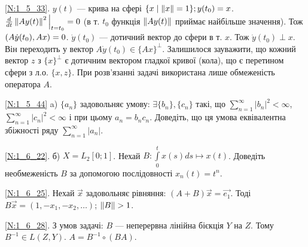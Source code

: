 \noindent\ref{N:1_5_33}.
    $y(t)$ --- крива на сфері $\{x \mid \left\lVert x\right\rVert = 1\}; y(t_0) = x$. $\frac{d}{dt} \left\lVert A y(t)\right\rVert^2 \Big|_{t = t_0} = 0$
    (в т. $t_0$ функція $\left\lVert A y(t)\right\rVert$ приймає найбільше значення). Тож $\left(A \dot{y} (t_0), A x\right) = 0$.
    $\dot{y} (t_0)$ --- дотичний вектор до сфери в т. $x$. Тож $\dot{y} (t_0) \perp x$. 
Він переходить у вектор $A \dot{y} (t_0) \in \{Ax\}^{\perp}$. Залишилося зауважити, що кожний вектор $z$ з $\{x\}^{\perp}$ є дотичним вектором
гладкої кривої (кола), що є перетином сфери з л.о. $\{x, z\}$. При розв'язанні задачі використана лише обмеженість оператора $A$.

\noindent \ref{N:1_5_44} a) $\{a_n\}$ задовольняє умову: $\exists \{b_n\}, 
\{c_n\}$ такі, що $\sum\limits_{n=1}^{\infty}|b_n|^2 < \infty$, 
$\sum\limits_{n=1}^{\infty}|c_n|^2 < \infty$ і при цьому $a_n = b_nc_n$.
Доведіть, що ця умова еквівалентна збіжності ряду $\sum\limits_{n=1}^\infty 
|a_n|$.

\noindent\ref{N:1_6_22}. б) $X = L_2 [0; 1]$. Нехай $B: \int\limits_0^t x(s) ds \mapsto x(t)$. Доведіть необмеженість
$B$ за допомогою послідовності $x_n(t) = t^n$.

\noindent\ref{N:1_6_25}. Нехай $\vec{x}$ задовольняє рівняння: $(A+B) \vec{x} = \vec{e_1}$.
Тоді $B \vec{x} = (1, -x_1, -x_2, \dots)$; $\left\lVert B\right\rVert > 1$.

\noindent\ref{N:1_6_28}. З умов задачі: $B$ --- неперервна лінійна бієкція $Y$ на $Z$. Тому
$B^{-1} \in L(Z, Y)$. $A = B^{-1} \circ (BA)$.

